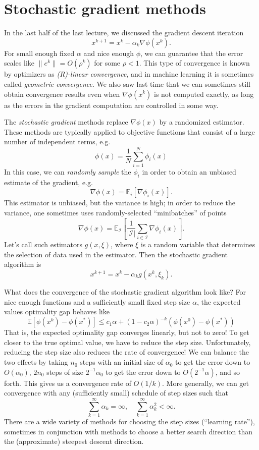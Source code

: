 \documentclass[12pt, leqno]{article} %
\begin{document}

\section{Stochastic gradient methods}

In the last half of the last lecture, we discussed the gradient descent
iteration
\[
  x^{k+1} = x^k - \alpha_k \nabla \phi(x^k).
\]
For small enough fixed $\alpha$ and nice enough $\phi$, we can guarantee
that the error scales like $\|e^k\| = O(\rho^k)$ for some $\rho < 1$.
This type of convergence is known by optimizers as
{\em (R)-linear convergence}, and in machine learning it is sometimes
called {\em geometric convergence}.  We also saw last time that we can
sometimes still obtain convergence results even when
$\nabla \phi(x^k)$ is not computed exactly, as long as the errors in the
gradient computation are controlled in some way.

The {\em stochastic gradient} methods replace $\nabla \phi(x)$ by a
randomized estimator.  These methods are typically applied to
objective functions that consist of a large number of independent
terms, e.g.
\[
  \phi(x) = \frac{1}{N} \sum_{i=1}^N \phi_i(x)
\]  
In this case, we can {\em randomly sample} the $\phi_i$ in order to
obtain an unbiased estimate of the gradient, e.g.
\[
  \nabla \phi(x) = \mathbb{E}_i [\nabla \phi_i(x)].
\]
This estimator is unbiased, but the variance is high; in order to
reduce the variance, one sometimes uses randomly-selected
``minibatches'' of points
\[
  \nabla \phi(x) =
  \mathbb{E}_{\mathcal I} \left[
    \frac{1}{|\mathcal{I}|} \sum_{i \in \mathcal{I}} \nabla \phi_i(x)
  \right].
\]
Let's call such estimators $g(x, \xi)$, where $\xi$ is a random
variable that determines the selection of data used in the estimator.
Then the stochastic gradient algorithm is
\[
  x^{k+1} = x^k - \alpha_k g(x^k, \xi_k).
\]

What does the convergence of the stochastic gradient algorithm
look like?  For nice enough functions and a sufficiently small
fixed step size $\alpha$, the expected values optimality gap behaves like
\[
  \mathbb{E}[\phi(x^k)-\phi(x^*)] \leq
  c_1 \alpha + (1-c_2 \alpha)^{-k} \left( \phi(x^0)-\phi(x^*) \right)
\]
That is, the expected optimality gap converges linearly, but not to
zero!  To get closer to the true optimal value, we have to reduce the
step size.  Unfortunately, reducing the step size also reduces the
rate of convergence!  We can balance the two effects by taking $n_0$
steps with an initial size of $\alpha_0$ to get the error down to
$O(\alpha_0)$, $2 n_0$ steps of size $2^{-1} \alpha_0$ to get the
error down to $O(2^{-1} \alpha)$, and so forth.  This gives us a
convergence rate of $O(1/k)$.  More generally, we can get convergence
with any (sufficiently small) schedule of step sizes such that
\[
  \sum_{k=1}^\infty \alpha_k = \infty, \quad
  \sum_{k=1}^\infty \alpha_k^2 < \infty.
\]
There are a wide variety of methods for choosing the step sizes
(``learning rate''), sometimes in conjunction with methods to choose
a better search direction than the (approximate) steepest descent direction.
\end{document}
